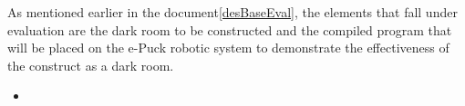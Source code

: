 As mentioned earlier in the document\ref{desBaseEval}, the elements that fall
under evaluation are the dark room to be constructed and the compiled program
that will be placed on the e-Puck robotic system to demonstrate the 
effectiveness of the construct as a dark room.

\begin{itemize}
\item
\end{itemize}

